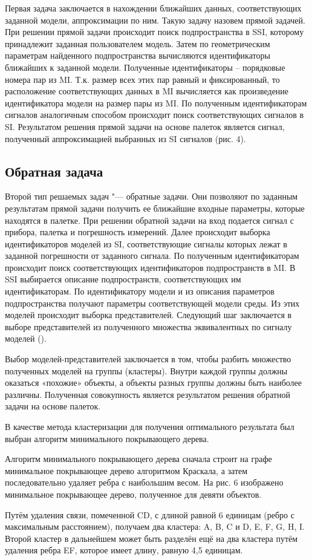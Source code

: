 Первая задача заключается в нахождении ближайших данных, соответствующих
заданной модели, аппроксимации по ним. Такую задачу назовем прямой задачей.
При решении прямой задачи происходит поиск подпространства в SSI, которому
принадлежит заданная пользователем модель. Затем по геометрическим
параметрам найденного подпространства вычисляются идентификаторы ближайших
к заданной модели.  Полученные идентификаторы – порядковые номера пар из
MI. Т.к. размер всех этих пар равный и фиксированный, то расположение
соответствующих данных в MI вычисляется как произведение идентификатора
модели на размер пары из MI. По полученным идентификаторам сигналов
аналогичным способом происходит поиск соответствующих сигналов в SI.
Результатом решения прямой задачи на основе палеток является сигнал,
полученный аппроксимацией выбранных из SI сигналов (рис. 4).


\subsection{Обратная задача}

Второй тип решаемых задач "--- обратные задачи. Они позволяют по заданным
результатам прямой задачи получить ее ближайшие входные параметры, которые
находятся в палетке. При решении обратной задачи на вход подается сигнал с
прибора, палетка и погрешность измерений. Далее происходит выборка
идентификаторов моделей из SI, соответствующие сигналы которых лежат в
заданной погрешности от заданного сигнала. По полученным идентификаторам
происходит поиск соответствующих идентификаторов подпространств в MI. В SSI
выбирается описание подпространств, соответствующих им идентификаторам. По
идентификатору модели и из описания параметров подпространства получают
параметры соответствующей модели среды. Из этих моделей происходит выборка
представителей. Следующий шаг заключается в выборе представителей из
полученного множества эквивалентных по сигналу моделей ().

Выбор моделей-представителей заключается в том, чтобы разбить множество
полученных моделей на группы (кластеры). Внутри каждой группы должны
оказаться «похожие» объекты, а объекты разных группы должны быть наиболее
различны. Полученная совокупность является результатом решения обратной
задачи на основе палеток.

В качестве метода кластеризации для получения оптимального результата был
выбран алгоритм минимального покрывающего дерева.

Алгоритм минимального покрывающего дерева сначала строит на графе
минимальное покрывающее дерево алгоритмом Краскала, а затем последовательно
удаляет ребра с наибольшим весом. На рис. 6 изображено минимальное
покрывающее дерево, полученное для девяти объектов.

Путём удаления связи, помеченной CD, с длиной равной 6 единицам (ребро с
максимальным расстоянием), получаем два кластера: {A, B, C} и {D, E, F, G,
H, I}. Второй кластер в дальнейшем может быть разделён ещё на два кластера
путём удаления ребра EF, которое имеет длину, равную 4,5 единицам.

